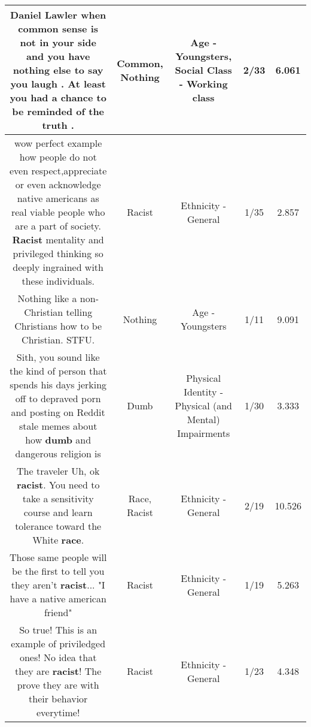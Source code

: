 \documentclass[11pt]{article}
\newlength\mylength
\begin{document}
\begin{center}
\begin{longtable}{|C{.65\mylength}|C{.30\mylength}|C{.12\mylength}|C{.12\mylength}|C{.12\mylength}|}
  \small Daniel Lawler when \textbf{common} sense is not in your side and you have \textbf{nothing} else to say you laugh . At least you had a chance to be reminded of the truth .\normalsize   & Common, Nothing & Age - Youngsters, Social Class - Working class & 2/33 & 6.061 \\  \hline
  \small wow perfect example how people do not even respect,appreciate or even acknowledge native americans as real viable people who are a part of society. \textbf{Racist} mentality and privileged thinking so deeply ingrained with these individuals.\normalsize   & Racist & Ethnicity - General & 1/35 & 2.857 \\  \hline
  \small Nothing like a non-Christian telling Christians how to be Christian. STFU.\normalsize   & Nothing & Age - Youngsters & 1/11 & 9.091 \\  \hline
  \small Sith, you sound like the kind of person that spends his days jerking off to depraved porn and posting on Reddit stale memes about how \textbf{dumb} and dangerous religion is\normalsize   & Dumb & Physical Identity - Physical (and Mental) Impairments & 1/30 & 3.333 \\  \hline
  \small The traveler Uh, ok \textbf{racist}. You need to take a sensitivity course and learn tolerance toward the White \textbf{race}.\normalsize   & Race, Racist & Ethnicity - General & 2/19 & 10.526 \\  \hline
  \small Those same people will be the first to tell you they aren't \textbf{racist}... "I have a native american friend"\normalsize   & Racist & Ethnicity - General & 1/19 & 5.263 \\  \hline
  \small So true!  This is an example of priviledged ones!  No idea that they are \textbf{racist}!  The prove they are with their behavior everytime!\normalsize   & Racist & Ethnicity - General & 1/23 & 4.348 \\  \hline

\end{longtable}
\end{center}
\end{document}

